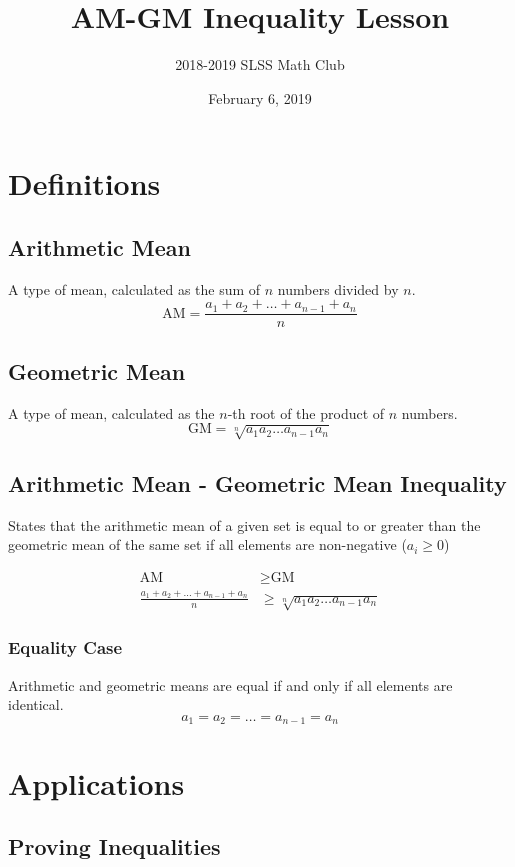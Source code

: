\documentclass[12pt]{article}
\title{AM-GM Inequality Lesson\vspace{-3mm}}
\author{2018-2019 SLSS Math Club\vspace{-5mm}}
\date{February 6, 2019\vspace{-5mm}}
\begin{document}
\maketitle

\section{Definitions}
\subsection{Arithmetic Mean}
A type of mean, calculated as the sum of $n$ numbers divided by $n$.
$$\text{AM} = \frac{a_{1} + a_{2} + \dots + a_{n - 1} + a_{n}}{n}$$

\subsection{Geometric Mean}
A type of mean, calculated as the $n$-th root of the product of $n$ numbers. $$\text{GM} = \sqrt[n]{a_{1} a_{2} \dots a_{n - 1} a_{n}}$$

\subsection{Arithmetic Mean - Geometric Mean Inequality}
States that the arithmetic mean of a given set is equal to or greater than the geometric mean of the same set if all elements are non-negative ($a_i \geq 0$)

\begin{align*}
    \text{AM} & \geq \text{GM} \\
     \frac{a_{1} + a_{2} + \dots + a_{n - 1} + a_{n}}{n} & \geq \sqrt[n]{a_{1} a_{2} \dots a_{n - 1} a_{n}}
\end{align*}

\subsubsection{Equality Case}
Arithmetic and geometric means are equal if and only if all elements are identical. $$a_{1} = a_{2} = \dots = a_{n - 1} = a_{n}$$

\section{Applications}
\subsection{Proving Inequalities}
\end{document}
